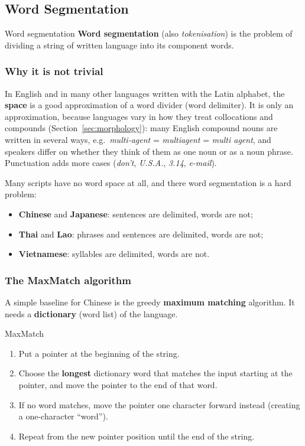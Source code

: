 \subsection{Word Segmentation}
\label{sec:word-segmentation}

\begin{nbdef}{Word segmentation}
\textbf{Word segmentation} (also \emph{tokenisation}) is the problem of dividing a string
of written language into its component words.
\end{nbdef}

\subsubsection{Why it is not trivial}

In English and in many other languages written with the Latin alphabet, the
\textbf{space} is a good approximation of a word divider (word delimiter). It is only an
approximation, because languages vary in how they treat collocations and compounds
(Section~\ref{sec:morphology}): many English compound nouns are written in several ways,
e.g.\ \emph{multi-agent} = \emph{multiagent} = \emph{multi agent}, and speakers differ on
whether they think of them as one noun or as a noun phrase. Punctuation adds more cases
(\emph{don't}, \emph{U.S.A.}, \emph{3.14}, \emph{e-mail}).

Many scripts have no word space at all, and there word segmentation is a hard problem:
\begin{itemize}[nosep]
  \item \textbf{Chinese} and \textbf{Japanese}: sentences are delimited, words are not;
  \item \textbf{Thai} and \textbf{Lao}: phrases and sentences are delimited, words are not;
  \item \textbf{Vietnamese}: syllables are delimited, words are not.
\end{itemize}

\subsubsection{The MaxMatch algorithm}

A simple baseline for Chinese is the greedy \textbf{maximum matching} algorithm. It needs
a \textbf{dictionary} (word list) of the language.

\begin{nbdef}{MaxMatch}
\begin{enumerate}[nosep]
  \item Put a pointer at the beginning of the string.
  \item Choose the \textbf{longest} dictionary word that matches the input starting at
        the pointer, and move the pointer to the end of that word.
  \item If no word matches, move the pointer one character forward instead (creating a
        one-character ``word'').
  \item Repeat from the new pointer position until the end of the string.
\end{enumerate}
\end{nbdef}

